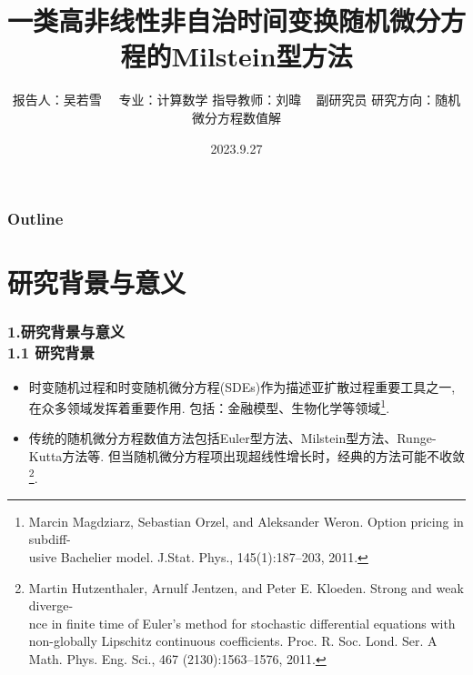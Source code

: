 \documentclass[notheorems,10pt,compress]{beamer}
\title[时间变换随机微分方程的Milstein型方法]{一类高非线性非自治时间变换随机微分方程的Milstein型方法}
\author[吴若雪]
{
	报告人：吴若雪~~ \vskip 3mm
	专业：计算数学 \vskip 3mm
	指导教师：刘暐 ~ 副研究员 \vskip 3mm
	研究方向：随机微分方程数值解
}
\institute[上海师范大学]{}
\date[2023.9.27]{2023.9.27}
\numberwithin{figure}{section}
\numberwithin{table}{section}
\numberwithin{equation}{section}
\numberwithin{theorem}{section}
\numberwithin{definition}{section}
\numberwithin{lemma}{section}
\numberwithin{proposition}{section}
\numberwithin{corollary}{section}
\theoremstyle{example}
\begin{document}
	
	
	\begin{frame}
		\titlepage
	\end{frame}
	
	\begin{frame}
		\frametitle{Outline}
		\vskip -5.6pt
		\hspace*{1.5em}
		\parbox[t]{.95\textwidth}{
			\begin{minipage}[c][0.6\textheight]{\textwidth}
				\tableofcontents
			\end{minipage}
		}
	\end{frame}
	
	\section{研究背景与意义}
    
\begin{frame}
\frametitle{1.研究背景与意义\\ 1.1 研究背景}
		
            \begin{itemize}
                \setlength{\itemsep}{10pt}
      \item 时变随机过程和时变随机微分方程(SDEs)作为描述亚扩散过程重要工具之一, 在众多领域发挥着重要作用. 包括：金融模型、生物化学等领域\footnote{Marcin Magdziarz, Sebastian Orzel, and Aleksander Weron. Option pricing in subdiff-\\
          usive Bachelier model. J.Stat. Phys., 145(1):187–203, 2011.}.
            
      \item 传统的随机微分方程数值方法包括Euler型方法、Milstein型方法、Runge-
      Kutta方法等. 但当随机微分方程项出现超线性增长时，经典的方法可能不收敛\footnote{Martin Hutzenthaler, Arnulf Jentzen, and Peter E. Kloeden. Strong and weak diverge-\\
          nce in finite time of Euler’s method for stochastic differential equations with non-globally Lipschitz continuous coefficients. Proc. R. Soc. Lond. Ser. A Math. Phys. Eng. Sci., 467
          (2130):1563–1576, 2011.}.
	
            
       \end{itemize}
	\end{frame}
\end{document}
